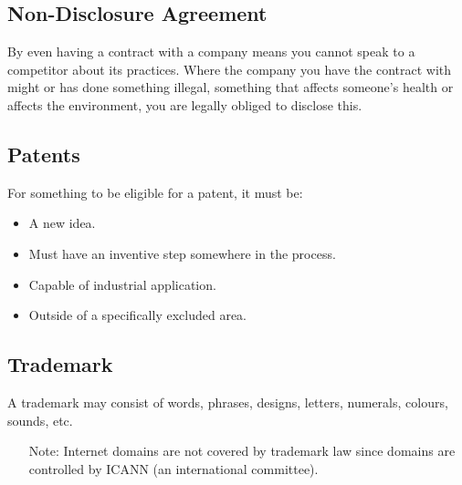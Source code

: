 \subsection{Non-Disclosure Agreement}\label{sub:non_disclosure_agreement}

By even having a contract with a company means you cannot speak to a competitor about its practices.
Where the company you have the contract with might or has done something illegal, something that affects someone's health or affects the environment, you are legally obliged to disclose this.

\subsection{Patents}\label{sub:patents}

For something to be eligible for a patent, it must be:

\begin{itemize}
	\item A new idea.
	\item Must have an inventive step somewhere in the process.
	\item Capable of industrial application.
	\item Outside of a specifically excluded area.
\end{itemize}

\subsection{Trademark}\label{sub:trademark}

A trademark may consist of words, phrases, designs, letters, numerals, colours, sounds, etc.

\begin{note}
	\begin{itemize}
		\item[Note:] Internet domains are not covered by trademark law since domains are controlled by ICANN (an international committee).
	\end{itemize}
\end{note}

